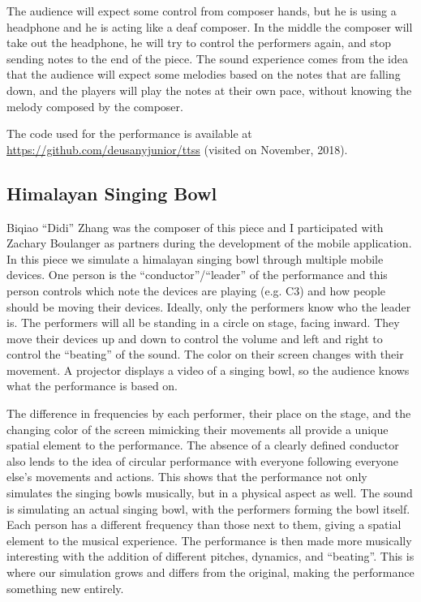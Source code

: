 The audience will expect some control from composer hands, but he is using a headphone and he is acting like a deaf composer. 
In the middle the composer will take out the headphone, he will try to control the performers again, and stop sending notes to the end of the piece.
The sound experience comes from the idea that the audience will expect some melodies based on the notes that are falling down, and the players will play the notes at their own pace, without knowing the melody composed by the composer.

The code used for the performance is available at \url{https://github.com/deusanyjunior/ttss} (visited on November, 2018).

\subsection*{Himalayan Singing Bowl}

Biqiao ``Didi'' Zhang was the composer of this piece and I participated with Zachary Boulanger as partners during the development of the mobile application.
In this piece we simulate a himalayan singing bowl through multiple mobile devices. 
One person is the ``conductor''/``leader'' of the performance and this person controls which note the devices are playing (e.g. C3) and how people should be moving their devices. 
Ideally, only the performers know who the leader is.
The performers will all be standing in a circle on stage, facing inward. 
They move their devices up and down to control the volume and left and right to control the ``beating'' of the sound. 
The color on their screen changes with their movement. 
A projector displays a video of a singing bowl, so the audience knows what the performance is based on.

The difference in frequencies by each performer, their place on the stage, and the changing color of the screen mimicking their movements all provide a unique spatial element to the performance. 
The absence of a clearly defined conductor also lends to the idea of circular performance with everyone following everyone else’s movements and actions. 
This shows that the performance not only simulates the singing bowls musically, but in a physical aspect as well.
The sound is simulating an actual singing bowl, with the performers forming the bowl itself. 
Each person has a different frequency than those next to them, giving a spatial element to the musical experience. 
The performance is then made more musically interesting with the addition of different pitches, dynamics, and ``beating''. 
This is where our simulation grows and differs from the original, making the performance something new entirely.

